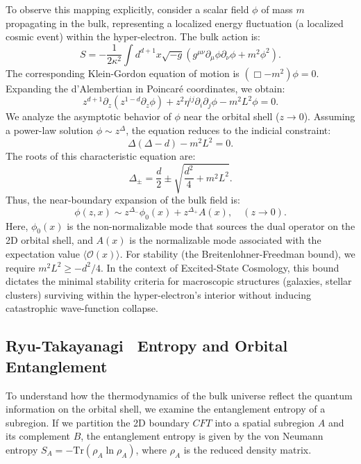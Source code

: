 To observe this mapping explicitly, consider a scalar field $\phi$ of mass $m$ propagating in the bulk, representing a localized energy fluctuation (a localized cosmic event) within the hyper-electron. The bulk action is:
\begin{equation}
    S = -\frac{1}{2\kappa^2} \int d^{d+1}x \sqrt{-g} \left( g^{\mu\nu} \partial_\mu \phi \partial_\nu \phi + m^2 \phi^2 \right).
\end{equation}
The corresponding Klein-Gordon equation of motion is $\left( \Box - m^2 \right) \phi = 0$. Expanding the d'Alembertian in Poincaré coordinates, we obtain:
\begin{equation}
    z^{d+1} \partial_z \left( z^{1-d} \partial_z \phi \right) + z^2 \eta^{ij} \partial_i \partial_j \phi - m^2 L^2 \phi = 0.
\end{equation}
We analyze the asymptotic behavior of $\phi$ near the orbital shell ($z \to 0$). Assuming a power-law solution $\phi \sim z^\Delta$, the equation reduces to the indicial constraint:
\begin{equation}
    \Delta(\Delta - d) - m^2 L^2 = 0.
\end{equation}
The roots of this characteristic equation are:
\begin{equation}
    \Delta_\pm = \frac{d}{2} \pm \sqrt{\frac{d^2}{4} + m^2 L^2}.
\end{equation}
Thus, the near-boundary expansion of the bulk field is:
\begin{equation}
    \phi(z, x) \sim z^{\Delta_-} \phi_0(x) + z^{\Delta_+} A(x), \quad (z \to 0).
\end{equation}
Here, $\phi_0(x)$ is the non-normalizable mode that sources the dual operator on the 2D orbital shell, and $A(x)$ is the normalizable mode associated with the expectation value $\langle \mathcal{O}(x) \rangle$. For stability (the Breitenlohner-Freedman bound), we require $m^2 L^2 \geq -d^2/4$. In the context of Excited-State Cosmology, this bound dictates the minimal stability criteria for macroscopic structures (galaxies, stellar clusters) surviving within the hyper-electron's interior without inducing catastrophic wave-function collapse.

\subsection{Ryu-Takayanagi~\cite{Ryu2006} Entropy and Orbital Entanglement}

To understand how the thermodynamics of the bulk universe reflect the quantum information on the orbital shell, we examine the entanglement entropy of a subregion. If we partition the 2D boundary $CFT$ into a spatial subregion $A$ and its complement $B$, the entanglement entropy is given by the von Neumann entropy $S_A = -\text{Tr}(\rho_A \ln \rho_A)$, where $\rho_A$ is the reduced density matrix.

